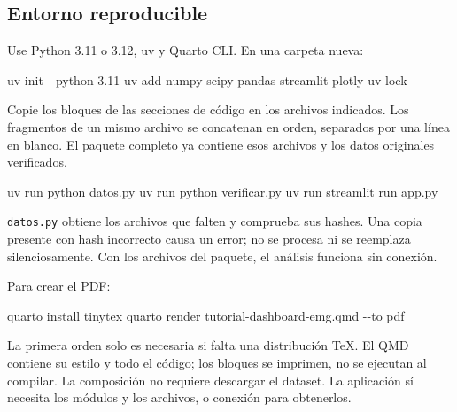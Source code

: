 \documentclass[
  spanish,
  10.5pt,
  a4paper,
  DIV=11,
  numbers=noendperiod]{scrartcl}
\newenvironment{Shaded}{\begin{snugshade}}{\end{snugshade}}
\newcommand{\AttributeTok}[1]{\textcolor[rgb]{0.40,0.45,0.13}{#1}}
\newcommand{\ExtensionTok}[1]{\textcolor[rgb]{0.00,0.23,0.31}{#1}}
\newcommand{\NormalTok}[1]{\textcolor[rgb]{0.00,0.23,0.31}{#1}}
\begin{document}
\subsection{Entorno reproducible}\label{entorno-reproducible}

Use Python 3.11 o 3.12, uv y Quarto CLI. En una carpeta nueva:

\begin{Shaded}
\begin{Highlighting}[]
\ExtensionTok{uv}\NormalTok{ init }\AttributeTok{{-}{-}python}\NormalTok{ 3.11}
\ExtensionTok{uv}\NormalTok{ add numpy scipy pandas streamlit plotly}
\ExtensionTok{uv}\NormalTok{ lock}
\end{Highlighting}
\end{Shaded}

Copie los bloques de las secciones de código en los archivos indicados.
Los fragmentos de un mismo archivo se concatenan en orden, separados por
una línea en blanco. El paquete completo ya contiene esos archivos y los
datos originales verificados.

\begin{Shaded}
\begin{Highlighting}[]
\ExtensionTok{uv}\NormalTok{ run python datos.py}
\ExtensionTok{uv}\NormalTok{ run python verificar.py}
\ExtensionTok{uv}\NormalTok{ run streamlit run app.py}
\end{Highlighting}
\end{Shaded}

\texttt{datos.py} obtiene los archivos que falten y comprueba sus
hashes. Una copia presente con hash incorrecto causa un error; no se
procesa ni se reemplaza silenciosamente. Con los archivos del paquete,
el análisis funciona sin conexión.

Para crear el PDF:

\begin{Shaded}
\begin{Highlighting}[]
\ExtensionTok{quarto}\NormalTok{ install tinytex}
\ExtensionTok{quarto}\NormalTok{ render tutorial{-}dashboard{-}emg.qmd }\AttributeTok{{-}{-}to}\NormalTok{ pdf}
\end{Highlighting}
\end{Shaded}

La primera orden solo es necesaria si falta una distribución TeX. El QMD
contiene su estilo y todo el código; los bloques se imprimen, no se
ejecutan al compilar. La composición no requiere descargar el dataset.
La aplicación sí necesita los módulos y los archivos, o conexión para
obtenerlos.
\end{document}
